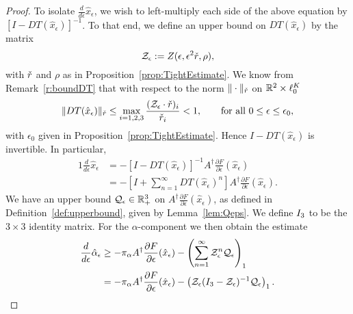 \begin{proof}
To isolate $\frac{d }{d \epsilon} \hat{x}_\epsilon   $, we wish to left-multiply each side of the above equation by $[I-DT(\hat{x}_\epsilon)]^{-1}$. 
To that end, we define an upper bound on $DT(\hat{x}_\epsilon)$ by  the matrix 
\begin{equation}\label{e:defZeps}
	\mathcal{Z}_\epsilon := Z(\epsilon,\epsilon^2 \check{r}, \rho) ,
\end{equation}
with $\check{r}$ and $\rho$ as in Proposition~\ref{prop:TightEstimate}.
We know from Remark~\ref{r:boundDT} 
that with respect to the norm $\| \cdot \|_{\check{r}}$ on $\mathbb{R}^2 \times \ell^K_0$
\[
\| DT(\hat{x}_\epsilon)  \|_{\check{r}} \leq \max_{i=1,2,3} \frac{( \mathcal{Z}_\epsilon \cdot \check{r})_i}{\check{r}_i} < 1, \qquad\text{for all } 0 \leq \epsilon \leq \epsilon_0, 
\]
with $\epsilon_0$ given in Proposition~\ref{prop:TightEstimate}. 
Hence $I-DT(\hat{x}_\epsilon) $ is invertible. In particular,
\begin{alignat*}{1}
\frac{d }{d \epsilon} \hat{x}_\epsilon   
& =- \left[I-DT(\hat{x}_\epsilon)  \right]^{-1}  A^{\dagger} \frac{\partial F}{\partial  \epsilon}(\hat{x}_\epsilon)  \\
& = - \left[I + \sum_{n=1}^\infty DT(\hat{x}_\epsilon)^n  \right]  A^{\dagger} \frac{\partial F}{\partial  \epsilon}(\hat{x}_\epsilon) .
\end{alignat*}
We  have an upper bound $\mathcal{Q}_\epsilon \in \mathbb{R}^3_+$ on $A^{\dagger} \frac{\partial F}{\partial  \epsilon}(\hat{x}_\epsilon)$, as defined in Definition~\ref{def:upperbound}, given by Lemma~\ref{lem:Qeps}. 
We define $I_3$ to be the $3 \times 3$ identity matrix.
For the $\alpha$-component we then obtain the estimate
\begin{alignat}{1}
\frac{d }{d \epsilon} \hat{\alpha}_\epsilon  
&\geq - \pi_\alpha  A^{\dagger} \frac{\partial F}{\partial  \epsilon}(\hat{x}_\epsilon)  
- \left( \sum_{n=1}^\infty \ZZ_\epsilon^n \QQ_\epsilon \right)_1 \nonumber \\
& = - \pi_\alpha  A^{\dagger} \frac{\partial F}{\partial  \epsilon}(\hat{x}_\epsilon)  - \left( \ZZ_\epsilon (\II-\ZZ_\epsilon)^{-1} \QQ_\epsilon \right)_1 . \label{e:alphaepsilon}

\end{alignat}
\end{proof}

